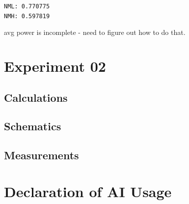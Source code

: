 \documentclass[10pt,letter]{article}
\begin{document}
\begin{verbatim}
NML: 0.770775
NMH: 0.597819
\end{verbatim}

avg power is incomplete - need to figure out how to do that.

\section*{Experiment 02}
\subsection*{Calculations}
\subsection*{Schematics}
\subsection*{Measurements}

\section*{Declaration of AI Usage}
\end{document}
